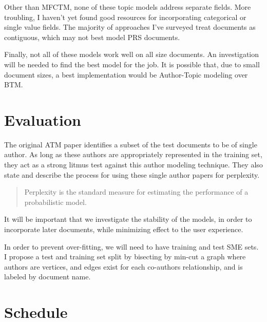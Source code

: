 \documentclass{article}
\begin{document}
\begin{multicols}{2}
Other than MFCTM\cite{Salomatin2009MultifieldCT}, none of these topic models
address separate fields. More troubling, I haven't yet found good resources for
incorporating categorical or single value fields. The majority of approaches I've surveyed
treat documents as contiguous, which may not best model PRS documents.

Finally, not all of these models work well on all size documents. An investigation will
be needed to find the best model for the job. It is possible that, due to small document
sizes, a best implementation would be Author-Topic modeling over BTM.

\section{Evaluation}

The original ATM paper identifies a subset of the test documents to be of single author.
As long as these authors are appropriately represented in the training set, they act as
a strong litmus test against this author modeling technique. They also state and describe
the process for using these single author papers for perplexity.
\begin{quote}
  Perplexity is the standard measure for estimating the performance of a probabilistic model.
\end{quote}

It will be important that we investigate the stability of the models\cite{Yang2016}, in order
to incorporate later documents, while minimizing effect to the user experience.

In order to prevent over-fitting, we will need to have training and test SME sets.
I propose a test and training set split by bisecting by min-cut\cite{Feige2002} a graph where
authors are vertices, and edges exist for each co-authors relationship, and is labeled by
document name.

\section{Schedule}


\end{multicols}
\end{document}
